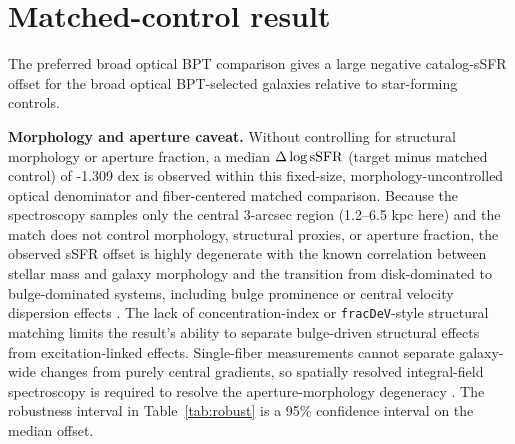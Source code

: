 \documentclass[twocolumn]{aastex631}
\begin{document}
\section{Matched-control result}
The preferred broad optical BPT comparison gives a large negative catalog-sSFR offset for the broad optical BPT-selected galaxies relative to star-forming controls.
    \par\noindent\textbf{Morphology and aperture caveat.} Without controlling for structural morphology or aperture fraction, a median $\Delta\log {\rm sSFR}$ (target minus matched control) of -1.309 dex is observed within this fixed-size, morphology-uncontrolled optical denominator and fiber-centered matched comparison. Because the spectroscopy samples only the central 3-arcsec region (1.2--6.5 kpc here) and the match does not control morphology, structural proxies, or aperture fraction, the observed sSFR offset is highly degenerate with the known correlation between stellar mass and galaxy morphology and the transition from disk-dominated to bulge-dominated systems, including bulge prominence or central velocity dispersion effects \citep{schawinski2010,bluck2014,belfiore2016,piotrowska2022}. The lack of concentration-index or \texttt{fracDeV}-style structural matching limits the result's ability to separate bulge-driven structural effects from excitation-linked effects. Single-fiber measurements cannot separate galaxy-wide changes from purely central gradients, so spatially resolved integral-field spectroscopy is required to resolve the aperture-morphology degeneracy \citep{penny2018,cheung2016,bundy2015}. The robustness interval in Table~\ref{tab:robust} is a 95\% confidence interval on the median offset.
\end{document}
